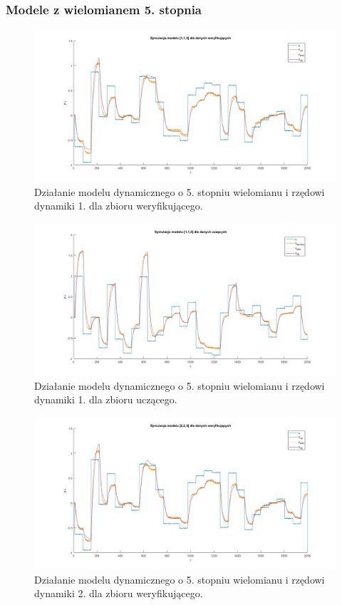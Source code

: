 \subsubsection{Modele z wielomianem 5. stopnia}
\begin{figure}[H]
\centering
\includegraphics[width=16cm,trim={3cm 0.5cm 3cm 0.5cm},clip]{images/d25.png}
\caption{Działanie modelu dynamicznego o 5. stopniu wielomianu i rzędowi dynamiki 1. dla zbioru weryfikującego.}
\label{fig:d25}
\end{figure}
\begin{figure}[H]
\centering
\includegraphics[width=16cm,trim={3cm 0.5cm 3cm 0.5cm},clip]{images/d26.png}
\caption{Działanie modelu dynamicznego o 5. stopniu wielomianu i rzędowi dynamiki 1. dla zbioru uczącego.}
\label{fig:d26}
\end{figure}
\begin{figure}[H]
\centering
\includegraphics[width=16cm,trim={3cm 0.5cm 3cm 0.5cm},clip]{images/d27.png}
\caption{Działanie modelu dynamicznego o 5. stopniu wielomianu i rzędowi dynamiki 2. dla zbioru weryfikującego.}
\label{fig:d27}
\end{figure}
